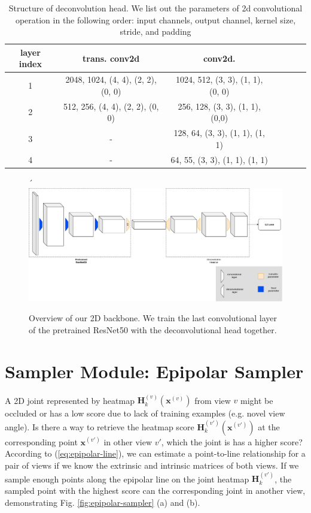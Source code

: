 \begin{table}[htpb]
	\centering
	\begin{tabular}{|c|c|c|c|c|c|c|}
		\toprule
		layer index & trans. conv2d & conv2d.\\
		\midrule
		1 & 2048, 1024, (4, 4), (2, 2), (0, 0) & 1024, 512, (3, 3), (1, 1), (0, 0)\\ \hline
		2 & 512, 256, (4, 4), (2, 2), (0, 0) & 256, 128, (3, 3), (1, 1), (0,0) \\ \hline
		3 & - & 128, 64, (3, 3), (1, 1), (1, 1) \\ \hline
		4 & - & 64, 55, (3, 3), (1, 1), (1, 1)\\ \hline
		\bottomrule
	\end{tabular}
\caption[Structure of deconvolution head]{Structure of deconvolution head. We list out the parameters of 2d convolutional operation in the following order: input channels, output channel, kernel size, stride, and padding}\label{tbl:2d-backbone}
\end{table}

\begin{figure}´
	\centering
	\includegraphics[width=1.0\columnwidth, height=0.5\columnwidth]{figures/ch5/2d-backbone-architecture.png}
	\caption{Overview of our 2D backbone. We train the last convolutional layer of the pretrained ResNet50 with the deconvolutional head together.} 
	\label{fig:2d-backbone}
\end{figure}


\section{Sampler Module: Epipolar Sampler}\label{ch4:fusion-module}
A 2D joint represented by heatmap $\mathbf{H}_k^{(v)}(\mathbf{x}^{(v)})$ from view $\mathit{v}$ might be occluded or has a low score due to lack of training examples (e.g. novel view angle). Is there a way to retrieve the heatmap score $\mathbf{H}_k^{(v')}(\mathbf{x}^{(v')})$ at the corresponding point $\mathbf{x}^{(v')}$ in other view $\mathit{v}'$, which the joint is has a higher score? According to (\ref{eq:epipolar-line}), we can estimate a point-to-line relationship for a pair of views if we know the extrinsic and intrinsic matrices of both views. If we sample enough points along the epipolar line on the joint heatmap $\mathbf{H}_k^{(v')}$, the sampled point with the highest score can the corresponding joint in another view, demonstrating Fig. \ref{fig:epipolar-sampler} (a) and (b).

